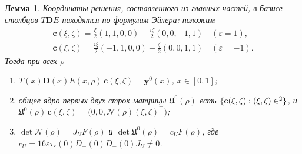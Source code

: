 \documentclass[12pt,a4paper]{article}
\numberwithin{equation}{section}
\newtheorem{lemma}{Лемма}
\theoremstyle{definition}
\let\C\relax\newcommand{\C}{\mathbb C}
\newcommand{\Uf}{\mathfrak U}
\newcommand{\Mm}{\mathcal N}
\newcommand{\Dd}{\mathbf D}
\begin{document}
\begin{lemma}\label{lem:kernel}
Координаты решения, составленного из главных частей, в базисе столбцов $T\Dd E$ находятся по
формулам Эйлера: положим
\[
\begin{gathered}
 \mathbf c(\xi,\zeta)=\frac{\xi}{2}(1,1,0,0)+\frac{i\zeta}{2}(0,0,-1,1)\quad(\varepsilon=1),\\
 \mathbf c(\xi,\zeta)=\frac{i\xi}{2}(-1,1,0,0)+\frac{\zeta}{2}(0,0,1,1)\quad(\varepsilon=-1).
\end{gathered}
\]
Тогда при всех $\rho$
\begin{enumerate}
\item[(a)] $T(x)\Dd(x)E(x,\rho)\,\mathbf c(\xi,\zeta)=\mathbf y^0(x)$, $x\in[0,1]$;
\item[(b)] общее ядро первых двух строк матрицы $\Uf^0(\rho)$ есть
 $\{\mathbf c(\xi,\zeta):(\xi,\zeta)\in\C^2\}$, и
 $\Uf^0(\rho)\,\mathbf c(\xi,\zeta)=\bigl(0,0,\Mm(\rho)(\xi,\zeta)^{\top}\bigr)$;
\item[(c)] $\det\Mm(\rho)=J_UF(\rho)$ и
 $\det\Uf^0(\rho)=c_UF(\rho)$, где $c_U=16\varepsilon\tau_\varepsilon(0)D_+(0)D_-(0)J_U\ne0$.
\end{enumerate}
\end{lemma}
\end{document}
